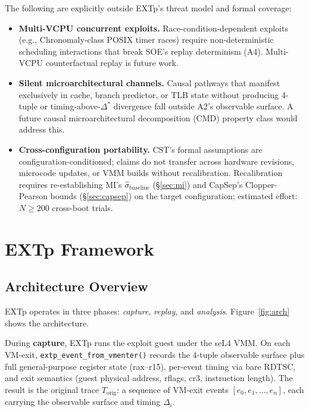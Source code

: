 \documentclass[conference]{IEEEtran}
\newcommand{\Korig}{T_\text{orig}}
\newcommand{\sigbase}{\hat{\sigma}_\text{baseline}}
\newcommand{\Dstar}{\Delta^{*}}
\begin{document}
The following are explicitly outside EXTp's threat model and formal
coverage:
\begin{itemize}
\item \textbf{Multi-VCPU concurrent exploits.} Race-condition-dependent
  exploits (e.g., Chronomaly-class POSIX timer races) require
  non-deterministic scheduling interactions that break SOE's replay
  determinism (A4). Multi-VCPU counterfactual replay is future work.
\item \textbf{Silent microarchitectural channels.} Causal pathways
  that manifest exclusively in cache, branch predictor, or TLB state
  without producing 4-tuple or timing-above-$\Dstar$ divergence fall
  outside A2's observable surface. A future causal
  microarchitectural decomposition (CMD) property class would
  address this.
\item \textbf{Cross-configuration portability.} CST's formal
  assumptions are configuration-conditioned; claims do not transfer
  across hardware revisions, microcode updates, or VMM builds without
  recalibration. Recalibration requires re-establishing MI's
  $\sigbase$ (\S\ref{sec:mi}) and CapSep's Clopper-Pearson bounds
  (\S\ref{sec:capsep}) on the target configuration; estimated effort:
  $N \geq 200$ cross-boot trials.
\end{itemize}

\section{EXTp Framework}\label{sec:framework}

\subsection{Architecture Overview}

EXTp operates in three phases: \emph{capture}, \emph{replay}, and
\emph{analysis}. Figure~\ref{fig:arch} shows the architecture.

During \textbf{capture}, EXTp runs the exploit guest under the seL4
VMM. On each VM-exit, \texttt{extp\_event\_from\_vmenter()} records
the 4-tuple observable surface plus full general-purpose register
state (rax--r15), per-event timing via bare RDTSC, and exit semantics
(guest physical address, rflags, cr3, instruction length). The
result is the original trace $\Korig$: a sequence of VM-exit events
$[e_0, e_1, \ldots, e_n]$, each carrying the observable surface and
timing $\Delta_i$.
\end{document}
